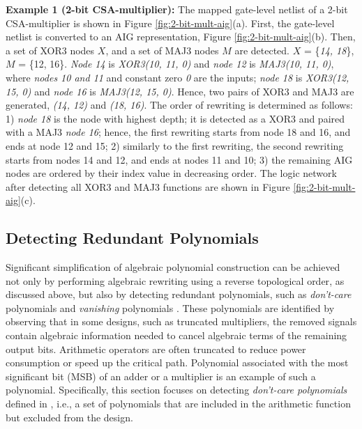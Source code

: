 \textbf{Example 1 (2-bit CSA-multiplier):} The mapped gate-level netlist of a 2-bit CSA-multiplier is shown in Figure \ref{fig:2-bit-mult-aig}(a). First, the gate-level netlist is converted to an AIG representation, Figure \ref{fig:2-bit-mult-aig}(b). Then, a set of XOR3 nodes $X$, and a set of MAJ3 nodes $M$ are detected. $X$ = \{\textit{14, 18}\}, $M$ = \{12, 16\}. \textit{Node 14} is \textit{XOR3(10, 11, 0)} and \textit{node 12} is \textit{MAJ3(10, 11, 0)}, where \textit{nodes 10 and 11} and constant zero \textit{0} are the inputs; \textit{node 18} is \textit{XOR3(12, 15, 0)} and \textit{node 16} is \textit{MAJ3(12, 15, 0)}. Hence, two pairs of XOR3 and MAJ3 are generated, \textit{(14, 12)} and \textit{(18, 16)}. The order of rewriting is determined as follows: 1) \textit{node 18} is the node with highest depth; it is detected as a XOR3 and paired with a MAJ3 \textit{node 16}; hence, the first rewriting starts from node 18 and 16, and ends at node 12 and 15; 2) similarly to the first rewriting, the second rewriting starts from nodes 14 and 12, and ends at nodes 11 and 10; 3) the remaining AIG nodes are ordered by their index value in decreasing order. The logic network after detecting all XOR3 and MAJ3 functions are shown in Figure \ref{fig:2-bit-mult-aig}(c). %


\subsection{Detecting Redundant Polynomials}

Significant simplification of algebraic polynomial construction can be achieved not only by performing algebraic rewriting using a {\color{red}reverse topological order}, as discussed above, but also by detecting redundant polynomials, {\color{red}such as \textit{don't-care} polynomials and \textit{vanishing} polynomials \cite{sayedformal:date-2016}\cite{yu-isvlsi-16a}. These polynomials are identified by observing that in some designs, such as truncated multipliers, the removed signals contain algebraic information needed to cancel algebraic terms of the remaining output bits. Arithmetic operators are often truncated to reduce power consumption or speed up the critical path. Polynomial associated with the most significant bit (MSB) of an adder or a multiplier is an example of such a polynomial. Specifically, this section focuses on detecting \textit{don't-care polynomials} defined in \cite{yu-isvlsi-16a}, i.e., a set of polynomials that are included in the arithmetic function but excluded from the design.} %
%

